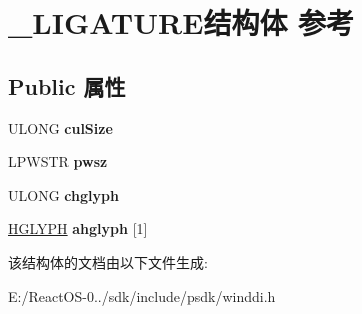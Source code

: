 \hypertarget{struct___l_i_g_a_t_u_r_e}{}\section{\+\_\+\+L\+I\+G\+A\+T\+U\+R\+E结构体 参考}
\label{struct___l_i_g_a_t_u_r_e}
\subsection*{Public 属性}
\begin{DoxyCompactItemize}
\item 
\mbox{\label{struct___l_i_g_a_t_u_r_e_aa5f8da57c3bc38f2c030ab23b6e3707f}} 
U\+L\+O\+NG {\bfseries cul\+Size}
\item 
\mbox{\label{struct___l_i_g_a_t_u_r_e_ac56d4f0d9c4f6e95c6c77f5949b76b14}} 
L\+P\+W\+S\+TR {\bfseries pwsz}
\item 
\mbox{\label{struct___l_i_g_a_t_u_r_e_a88c8e899e69ee2f48c466bf0c0dc4966}} 
U\+L\+O\+NG {\bfseries chglyph}
\item 
\mbox{\label{struct___l_i_g_a_t_u_r_e_a1ae2c725313c0d1138bc16b21b83e3db}} 
\hyperlink{interfacevoid}{H\+G\+L\+Y\+PH} {\bfseries ahglyph} \mbox{[}1\mbox{]}
\end{DoxyCompactItemize}


该结构体的文档由以下文件生成\+:\begin{DoxyCompactItemize}
\item 
E\+:/\+React\+O\+S-\/0../sdk/include/psdk/winddi.\+h\end{DoxyCompactItemize}
